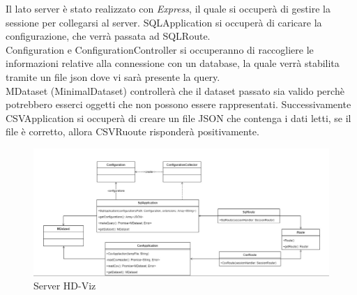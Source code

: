 \documentclass[../manuale_sviluppatore.tex]{subfiles}
\begin{document}
Il lato server è stato realizzato con \emph{Express}, il quale si occuperà di gestire la sessione per collegarsi al server.
SQLApplication si occuperà di caricare la configurazione, che verrà passata ad SQLRoute.\\
Configuration e ConfigurationController si occuperanno di raccogliere le informazioni relative alla connessione con un database, la quale verrà stabilita tramite un file
json dove vi sarà presente la query.\\
MDataset (MinimalDataset) controllerà che il dataset passato sia valido perchè potrebbero esserci oggetti che non possono essere rappresentati. Successivamente
CSVApplication si occuperà di creare un file JSON che contenga i dati letti, se il file è corretto, allora CSVRuoute risponderà positivamente.

\begin{figure}[H]
	\centering
	\includegraphics[width=18cm]{img/server.jpg}
	\caption{Server HD-Viz}
\end{figure}
\end{document}
